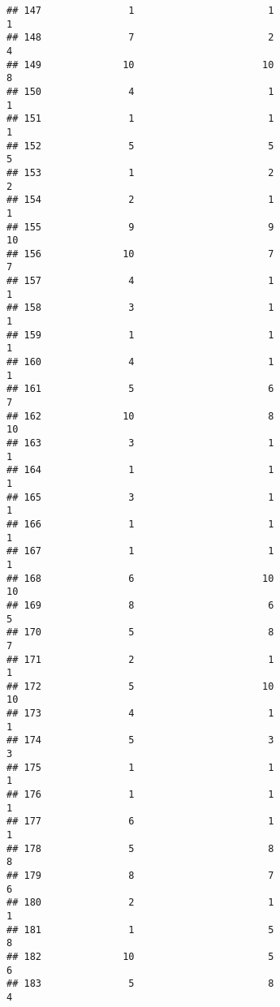 \documentclass[
]{article}
\begin{document}
\begin{verbatim}
## 147               1                       1                        1
## 148               7                       2                        4
## 149              10                      10                        8
## 150               4                       1                        1
## 151               1                       1                        1
## 152               5                       5                        5
## 153               1                       2                        2
## 154               2                       1                        1
## 155               9                       9                       10
## 156              10                       7                        7
## 157               4                       1                        1
## 158               3                       1                        1
## 159               1                       1                        1
## 160               4                       1                        1
## 161               5                       6                        7
## 162              10                       8                       10
## 163               3                       1                        1
## 164               1                       1                        1
## 165               3                       1                        1
## 166               1                       1                        1
## 167               1                       1                        1
## 168               6                      10                       10
## 169               8                       6                        5
## 170               5                       8                        7
## 171               2                       1                        1
## 172               5                      10                       10
## 173               4                       1                        1
## 174               5                       3                        3
## 175               1                       1                        1
## 176               1                       1                        1
## 177               6                       1                        1
## 178               5                       8                        8
## 179               8                       7                        6
## 180               2                       1                        1
## 181               1                       5                        8
## 182              10                       5                        6
## 183               5                       8                        4

\end{verbatim}
\end{document}
